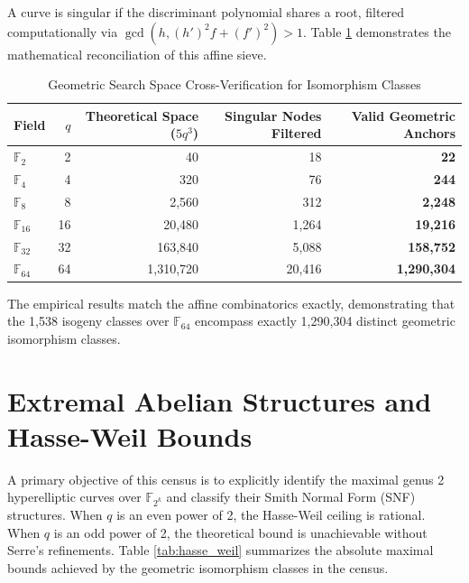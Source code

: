 \documentclass[letterpaper, 11pt]{article}
\begin{document}
A curve is singular if the discriminant polynomial shares a root, filtered computationally via $\gcd(h, (h')^2f + (f')^2) > 1$. Table \ref{tab:geometric_space} demonstrates the mathematical reconciliation of this affine sieve.

\begin{table}[h]
    \centering
    \caption{Geometric Search Space Cross-Verification for Isomorphism Classes}
    \label{tab:geometric_space}
    \begin{tabular}{lrrrr}
        \toprule
        Field & $q$ & Theoretical Space ($5q^3$) & Singular Nodes Filtered & Valid Geometric Anchors \\
        \midrule
        $\mathbb{F}_2$ & 2 & 40 & 18 & \textbf{22} \\
        $\mathbb{F}_4$ & 4 & 320 & 76 & \textbf{244} \\
        $\mathbb{F}_8$ & 8 & 2,560 & 312 & \textbf{2,248} \\
        $\mathbb{F}_{16}$ & 16 & 20,480 & 1,264 & \textbf{19,216} \\
        $\mathbb{F}_{32}$ & 32 & 163,840 & 5,088 & \textbf{158,752} \\
        $\mathbb{F}_{64}$ & 64 & 1,310,720 & 20,416 & \textbf{1,290,304} \\
        \bottomrule
    \end{tabular}
\end{table}

The empirical results match the affine combinatorics exactly, demonstrating that the 1,538 isogeny classes over $\mathbb{F}_{64}$ encompass exactly 1,290,304 distinct geometric isomorphism classes. 

\section{Extremal Abelian Structures and Hasse-Weil Bounds}
A primary objective of this census is to explicitly identify the maximal genus 2 hyperelliptic curves over $\mathbb{F}_{2^k}$ and classify their Smith Normal Form (SNF) structures. When $q$ is an even power of 2, the Hasse-Weil ceiling is rational. When $q$ is an odd power of 2, the theoretical bound is unachievable without Serre's refinements. Table \ref{tab:hasse_weil} summarizes the absolute maximal bounds achieved by the geometric isomorphism classes in the census.
\end{document}
